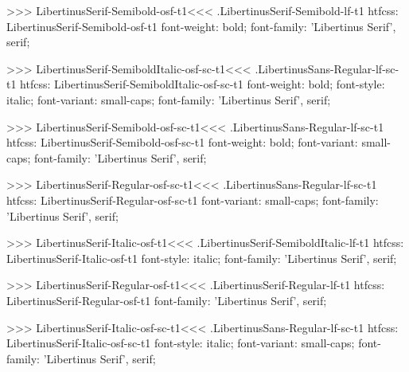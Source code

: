 {{{{>>>
\<LibertinusSerif-Semibold-osf-t1\><<<
.LibertinusSerif-Semibold-lf-t1
htfcss:  LibertinusSerif-Semibold-osf-t1  font-weight: bold; font-family: 'Libertinus Serif', serif;

>>>
\<LibertinusSerif-SemiboldItalic-osf-sc-t1\><<<
.LibertinusSans-Regular-lf-sc-t1
htfcss:  LibertinusSerif-SemiboldItalic-osf-sc-t1  font-weight: bold; font-style: italic; font-variant: small-caps; font-family: 'Libertinus Serif', serif;

>>>
\<LibertinusSerif-Semibold-osf-sc-t1\><<<
.LibertinusSans-Regular-lf-sc-t1
htfcss:  LibertinusSerif-Semibold-osf-sc-t1  font-weight: bold; font-variant: small-caps; font-family: 'Libertinus Serif', serif;

>>>
\<LibertinusSerif-Regular-osf-sc-t1\><<<
.LibertinusSans-Regular-lf-sc-t1
htfcss:  LibertinusSerif-Regular-osf-sc-t1  font-variant: small-caps; font-family: 'Libertinus Serif', serif;

>>>
\<LibertinusSerif-Italic-osf-t1\><<<
.LibertinusSerif-SemiboldItalic-lf-t1
htfcss:  LibertinusSerif-Italic-osf-t1  font-style: italic; font-family: 'Libertinus Serif', serif;

>>>
\<LibertinusSerif-Regular-osf-t1\><<<
.LibertinusSerif-Regular-lf-t1
htfcss:  LibertinusSerif-Regular-osf-t1  font-family: 'Libertinus Serif', serif;

>>>
\<LibertinusSerif-Italic-osf-sc-t1\><<<
.LibertinusSans-Regular-lf-sc-t1
htfcss:  LibertinusSerif-Italic-osf-sc-t1  font-style: italic; font-variant: small-caps; font-family: 'Libertinus Serif', serif;

}}}}
